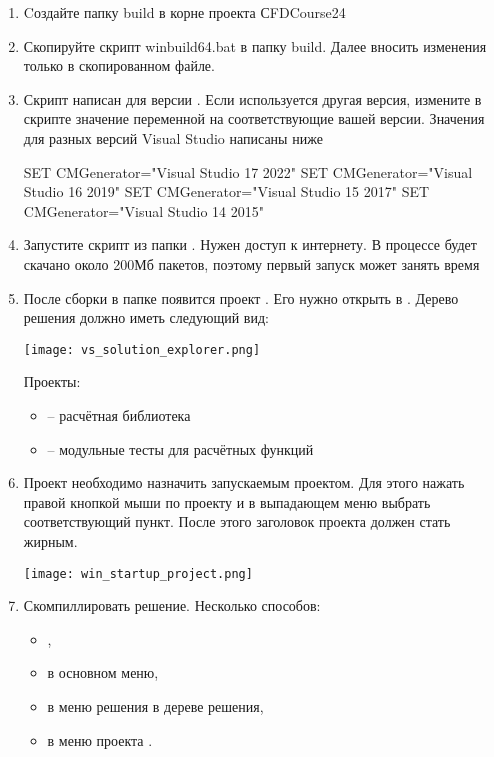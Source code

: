 \label{sec:vs-build}

\begin{enumerate}
\item
Cоздайте папку build в корне проекта СFDCourse24

\item
Скопируйте скрипт winbuild64.bat в папку build. Далее вносить изменения
только в скопированном файле.

\item
Скрипт написан для версии . Если используется другая версия,
измените в скрипте значение переменной  на соответствующие вашей версии.
Значения для разных версий Visual Studio написаны ниже
\begin{shelloutput}
SET CMGenerator="Visual Studio 17 2022"
SET CMGenerator="Visual Studio 16 2019"
SET CMGenerator="Visual Studio 15 2017"
SET CMGenerator="Visual Studio 14 2015"
\end{shelloutput}

\item
Запустите скрипт  из папки . Нужен доступ к интернету.
В процессе будет скачано около 200Мб пакетов, поэтому первый запуск может занять время

\item
После сборки в папке  появится проект  .
Его нужно открыть в .
Дерево решения должно иметь следующий вид:
\begin{center}
\texttt{[image: vs\_solution\_explorer.png]}
\end{center}
Проекты:
\begin{itemize}
\item {} -- расчётная библиотека
\item {} -- модульные тесты для расчётных функций
\end{itemize}

\item
Проект  необходимо назначить запускаемым проектом. Для этого нажать правой кнопкой мыши по проекту и в выпадающем меню
выбрать соответствующий пункт. После этого заголовок проекта должен стать жирным.
\begin{center}
\texttt{[image: win\_startup\_project.png]}
\end{center}

\item
Скомпиллировать решение. Несколько способов:
\begin{itemize}
\item {},
\item {} в основном меню,
\item {} в меню решения в дереве решения,
\item {} в меню проекта .
\end{itemize}


\end{enumerate}
